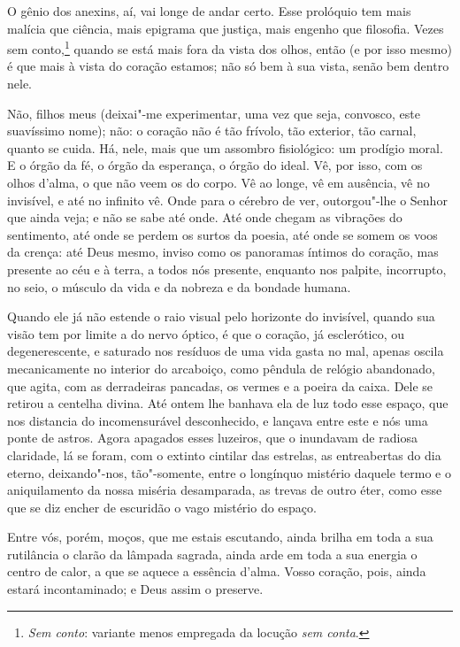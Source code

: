 O gênio dos anexins, aí, vai longe de andar certo. Esse prolóquio
tem mais malícia que ciência, mais epigrama que justiça, mais engenho
que filosofia. Vezes sem conto,\footnote{\textit{Sem conto}: variante menos empregada da locução \textit{sem conta}.} quando se está mais fora da vista dos olhos, então (e por
isso mesmo) é que mais à vista do coração estamos; não só bem à sua
vista, senão bem dentro nele.

Não, filhos meus (deixai"-me experimentar, uma vez que seja,
convosco, este suavíssimo nome); não: o coração não é tão frívolo, tão
exterior, tão carnal, quanto se cuida. Há, nele, mais que um assombro
fisiológico: um prodígio moral. E o órgão da fé, o órgão da esperança,
o órgão do ideal. Vê, por isso, com os olhos d'alma, o
que não veem os do corpo. Vê ao longe, vê em ausência, vê no invisível,
e até no infinito vê. Onde para o cérebro de ver, outorgou"-lhe o Senhor
que ainda veja; e não se sabe até onde. Até onde chegam as vibrações do
sentimento, até onde se perdem os surtos da poesia, até onde se somem
os voos da crença: até Deus mesmo, inviso como os panoramas íntimos do
coração, mas presente ao céu e à terra, a todos nós presente, enquanto nos palpite, incorrupto, no seio, o
músculo da vida e da nobreza e da bondade humana.

Quando ele já não estende o raio visual pelo horizonte do
invisível, quando sua visão tem por limite a do nervo óptico, é que o
coração, já esclerótico, ou degenerescente, e saturado nos resíduos de
uma vida gasta no mal, apenas oscila mecanicamente no interior do
arcaboiço, como pêndula de relógio abandonado, que agita, com as
derradeiras pancadas, os vermes e a poeira da caixa. Dele se retirou a
centelha divina. Até ontem lhe banhava ela de luz todo esse espaço, que
nos distancia do incomensurável desconhecido, e lançava entre este e
nós uma ponte de astros. Agora apagados esses luzeiros, que o inundavam
de radiosa claridade, lá se foram, com o extinto cintilar das estrelas,
as entreabertas do dia eterno, deixando"-nos, tão"-somente, entre o
longínquo mistério daquele termo e o aniquilamento da nossa miséria
desamparada, as trevas de outro éter, como esse que se diz encher de
escuridão o vago mistério do espaço.

Entre vós, porém, moços, que me estais escutando, ainda brilha em
toda a sua rutilância o clarão da lâmpada sagrada, ainda arde em toda a
sua energia o centro de calor, a que se aquece a essência
d'alma. Vosso coração, pois, ainda estará
incontaminado; e Deus assim o preserve.

